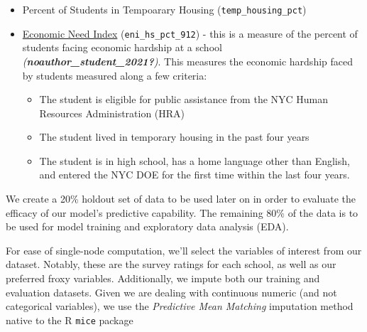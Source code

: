 \documentclass[
  man]{apa6}
\providecommand{\tightlist}{%
  \setlength{\itemsep}{0pt}\setlength{\parskip}{0pt}}
\begin{document}
\begin{itemize}
\tightlist
\item
  Percent of Students in Tempoarary Housing (\texttt{temp\_housing\_pct})
\item
  \href{https://data.cccnewyork.org/data/bar/1371/student-economic-need-index\#1371/a/1/1622/127}{Economic Need Index} (\texttt{eni\_hs\_pct\_912}) - this is a measure of the percent of students facing economic hardship at a school \emph{(\textbf{noauthor\_student\_2021?})}. This measures the economic hardship faced by students measured along a few criteria:

  \begin{itemize}
  \tightlist
  \item
    The student is eligible for public assistance from the NYC Human Resources Administration (HRA)
  \item
    The student lived in temporary housing in the past four years
  \item
    The student is in high school, has a home language other than English, and entered the NYC DOE for the first time within the last four years.
  \end{itemize}
\end{itemize}

We create a 20\% holdout set of data to be used later on in order to evaluate the efficacy of our model's predictive capability. The remaining 80\% of the data is to be used for model training and exploratory data analysis (EDA).

For ease of single-node computation, we'll select the variables of interest from our dataset. Notably, these are the survey ratings for each school, as well as our preferred froxy variables. Additionally, we impute both our training and evaluation datasets. Given we are dealing with continuous numeric (and not categorical variables), we use the \emph{Predictive Mean Matching} imputation method native to the R \texttt{mice} package
\end{document}
